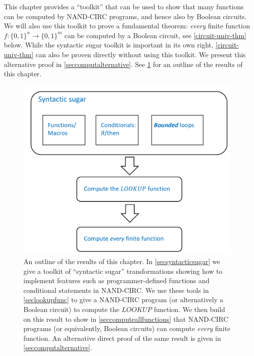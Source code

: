 This chapter provides a ``toolkit'' that can be used to show that many
functions can be computed by NAND-CIRC programs, and hence also by
Boolean circuits. We will also use this toolkit to prove a fundamental
theorem: \emph{every} finite function
\(f:\{0,1\}^n \rightarrow \{0,1\}^m\) can be computed by a Boolean
circuit, see \cref{circuit-univ-thm} below. While the syntactic sugar
toolkit is important in its own right, \cref{circuit-univ-thm} can also
be proven directly without using this toolkit. We present this
alternative proof in \cref{seccomputalternative}. See
\cref{computefuncoverviewfig} for an outline of the results of this
chapter.


\begin{figure}
\centering
\includegraphics[width=\textwidth, height=0.25\paperheight, keepaspectratio]{../figure/compute_every_function_overview.png}
\caption{An outline of the results of this chapter. In
\cref{secsyntacticsugar} we give a toolkit of ``syntactic sugar''
transformations showing how to implement features such as
programmer-defined functions and conditional statements in NAND-CIRC. We
use these tools in \cref{seclookupfunc} to give a NAND-CIRC program (or
alternatively a Boolean circuit) to compute the
\(\ensuremath{\mathit{LOOKUP}}\) function. We then build on this result
to show in \cref{seccomputeallfunctions} that NAND-CIRC programs (or
equivalently, Boolean circuits) can compute \emph{every} finite
function. An alternative direct proof of the same result is given in
\cref{seccomputalternative}.}
\label{computefuncoverviewfig}
\end{figure}

